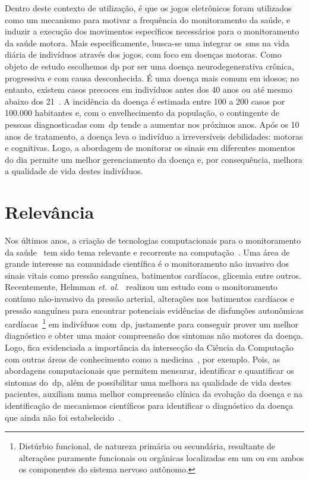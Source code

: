 Dentro deste contexto de utilização, é que os jogos eletrônicos foram utilizados como um mecanismo para motivar a frequência do monitoramento da saúde, e induzir a execução dos movimentos específicos necessários para o monitoramento da saúde motora. Mais especificamente, busca-se uma integrar os~\ac{sms} na vida diária de indivíduos através dos jogos, com foco em doenças motoras. Como objeto de estudo escolhemos \ac{dp} por ser uma doença neurodegenerativa crônica, progressiva e com causa desconhecida. É uma doença mais comum em idosos; no entanto, existem casos precoces em indivíduos antes dos 40 anos ou até mesmo abaixo dos 21~\cite{menezes2003}. A incidência da doença é estimada entre 100 a 200 casos por 100.000 habitantes e, com o envelhecimento da população, o contingente de pessoas diagnosticadas com~\ac{dp} tende a aumentar nos próximos anos. Após os 10 anos de tratamento, a doença leva o indivíduo a irreversíveis debilidades: motoras e cognitivas. Logo, a abordagem de monitorar os sinais em diferentes momentos do dia permite um melhor gerenciamento da doença e, por consequência, melhora a qualidade de vida destes indivíduos.









\section{Relevância}\label{section:relevancia}
Nos últimos anos, a criação de tecnologias computacionais para o monitoramento da saúde~\cite{bardram2008} tem sido tema relevante e recorrente na computação~\cite{bradmonitor2015,compapproachparkinson2015,mazilu2015}. Uma área de grande interesse na comunidade científica é o monitoramento não invasivo dos sinais vitais como pressão sanguínea, batimentos cardíacos, glicemia entre outros. Recentemente, Helmman \textit{et. al.}~\cite{autonomparkin2015} realizou um estudo com o monitoramento contínuo não-invasivo da pressão arterial, alterações nos batimentos cardíacos e pressão sanguínea para encontrar potenciais evidências de disfunções autonômicas cardíacas~\footnote{Distúrbio funcional, de natureza primária ou secundária, resultante de alterações  puramente funcionais ou orgânicas localizadas em um  ou em ambos os componentes do sistema nervoso autônomo.} em indivíduos com~\ac{dp}, justamente para conseguir prover um melhor diagnóstico e obter uma maior compreensão dos sintomas não motores da doença. Logo, fica evidenciada a importância da intersecção da Ciência da Computação com outras áreas de conhecimento como a medicina~\cite{bardram2008}, por exemplo. Pois, as abordagens computacionais que permitem mensurar, identificar e quantificar os sintomas do~\ac{dp}, além de possibilitar uma melhora na qualidade de vida destes pacientes, auxiliam numa melhor compreensão clínica da evolução da doença e na identificação de mecanismos científicos para identificar o diagnóstico da doença que ainda não foi estabelecido~\cite{compapproachparkinson2015}.


